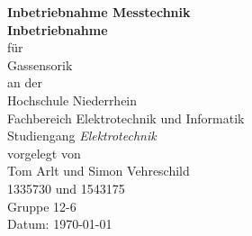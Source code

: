 \begin{titlepage}
    \begin{center}
        {\Large\bf Inbetriebnahme Messtechnik}\\[3cm]
        
        {\bf Inbetriebnahme}\\
        für \\
        Gassensorik\\[1.5cm]
        
        an der\\
        Hochschule Niederrhein\\
        Fachbereich Elektrotechnik und Informatik\\
        Studiengang {\em Elektrotechnik}\\[3cm]
        
        vorgelegt von\\
        Tom Arlt und Simon Vehreschild\\
        1335730 und 1543175\\
        Gruppe 12-6\\[3cm]
        Datum: \today\\[3cm]
        
    \end{center}
\end{titlepage}

\pagestyle{empty} %
